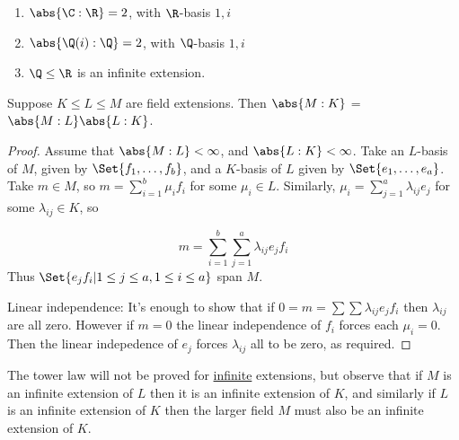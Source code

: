 \documentclass{article}
\begin{document}
\begin{eg}\leavevmode
    \begin{enumerate}[label=(\roman*)]
        \item $\abs{\C:\R} = 2$, with $\R$-basis $1, i$
        \item $\abs{\Q(i):\Q} = 2$, with $\Q$-basis $1, i$
        \item $\Q \leq \R$ is an infinite extension.
    \end{enumerate}
\end{eg}

\begin{nthm}\label{thm:towerLaw}
    Suppose $K \leq L \leq M$ are field extensions. Then $\abs{M:K}$ = $\abs{M:L}\abs{L:K}$.
\end{nthm}

\begin{proof}
    Assume that $\abs{M:L} < \infty$, and $\abs{L:K} < \infty$.
    Take an $L$-basis of $M$, given by $\Set{f_1, \dotsc, f_b}$, and a $K$-basis of $L$ given by $\Set{e_1, \dotsc, e_a}$.
    Take $m \in M$, so $m = \sum_{i=1}^b \mu_i f_i$ for some $\mu_i \in L$.
    Similarly, $\mu_i = \sum_{j=1}^a \lambda_{ij} e_j$ for some $\lambda_{ij} \in K$, so

    \begin{equation*}
        m = \sum_{i=1}^b \sum_{j=1}^a \lambda_{ij} e_j f_i
    \end{equation*}
    Thus $\Set{e_j f_i | 1 \leq j \leq a, 1 \leq i \leq a}$ span $M$.

    Linear independence:
    It's enough to show that if $0 = m = \sum \sum \lambda_{ij} e_j f_i$ then $\lambda_{ij}$ are all zero.
    However if $m = 0$ the linear independence of $f_i$ forces each $\mu_i = 0$.
    Then the linear indepedence of $e_j$ forces $\lambda_{ij}$ all to be zero, as required.
\end{proof}

The tower law will not be proved for \hyperlink{def:degreeOfFieldExt}{infinite} extensions, but observe that if $M$ is an infinite extension of $L$ then it is an infinite extension of $K$, and similarly if $L$ is an infinite extension of $K$ then the larger field $M$ must also be an infinite extension of $K$.
\end{document}
